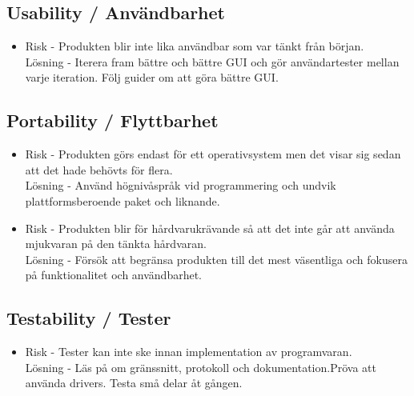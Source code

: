 \subsection{Usability / Användbarhet}
\begin{itemize}
\item Risk - Produkten blir inte lika användbar som var tänkt från början.
\\Lösning - Iterera fram bättre och bättre GUI och gör användartester mellan varje iteration. Följ guider om att göra bättre GUI.
\end{itemize}

\subsection{Portability / Flyttbarhet}
\begin{itemize}
\item Risk - Produkten görs endast för ett operativsystem men det visar sig sedan att det hade behövts för flera.
\\Lösning - Använd högnivåspråk vid programmering och undvik plattformsberoende paket och liknande.
\item Risk - Produkten blir för hårdvarukrävande så att det inte går att använda mjukvaran på den tänkta hårdvaran.
\\Lösning - Försök att begränsa produkten till det mest väsentliga och fokusera på funktionalitet och användbarhet.
\end{itemize}

\subsection{Testability / Tester}
\begin{itemize}
\item Risk - Tester kan inte ske innan implementation av programvaran.
\\Lösning - Läs på om gränssnitt, protokoll och dokumentation.Pröva att använda drivers. Testa små delar åt gången.
\end{itemize}

